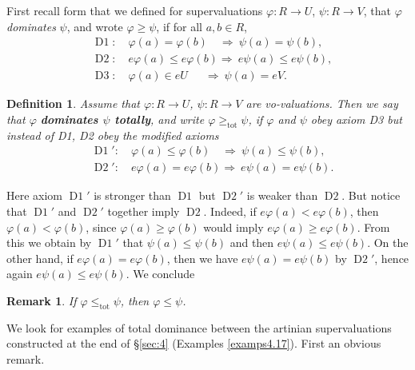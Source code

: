 \documentclass [12pt,a4paper,reqno]{amsart}
\newtheorem{remark}[thm]{Remark}
\newtheorem{defn}[thm]{Definition}
\begin{document}
First recall form \cite[\S5]{IKR1} that we defined for
supervaluations $ {\varphi}: R \to U$, $\psi: R \to V$, that ${\varphi}$
\emph{dominates} $\psi$, and wrote ${\varphi} \geq \psi$, if for all
$a,b \in R$,
\begin{align*}
& {\operatorname{D{1}}}: \quad   {\varphi}(a) = {\varphi}(b) \quad \Rightarrow  \  \psi(a) = \psi(b), \\
& {\operatorname{D{2}}}: \quad   e {\varphi}(a) \leq  e {\varphi}(b) \Rightarrow  \  e\psi(a) \leq e\psi(b), \\
& {\operatorname{D{3}}}: \quad   {\varphi}(a) \in eU  \ \; \quad \Rightarrow  \  \psi(a)
= eV.
\end{align*}
\begin{defn}\label{defn5.4} Assume that $ {\varphi}: R \to U$, $\psi: R \to
V$ are {vo}-valuations. Then we say that ${\varphi}$ \textbf{dominates
$\psi$ totally}, and write ${\varphi} {\geq_{\operatorname{tot}}} \psi$, if ${\varphi}$ and
$\psi$ obey axiom D3 but instead of D1, D2 obey the modified
axioms
\begin{align*}
& {\operatorname{D{1}}}': \quad   {\varphi}(a) \leq {\varphi}(b) \quad \Rightarrow  \  \psi(a) \leq \psi(b), \\
& {\operatorname{D{2}}}': \quad   e {\varphi}(a) =  e {\varphi}(b) \Rightarrow  \  e\psi(a) =
e\psi(b).
\end{align*}
\end{defn}
Here axiom ${\operatorname{D{1}}}'$ is stronger than ${\operatorname{D{1}}}$ but ${\operatorname{D{2}}}'$ is weaker than
${\operatorname{D{2}}}$. But notice that  ${\operatorname{D{1}}}'$ and ${\operatorname{D{2}}}'$ together imply ${\operatorname{D{2}}}$.
Indeed, if $ e{\varphi}(a) < e{\varphi}(b)$, then $ {\varphi}(a) < {\varphi}(b)$,
since $ {\varphi}(a) \geq {\varphi}(b)$ would imply $ e{\varphi}(a) \geq
e{\varphi}(b)$. From this we obtain by ${\operatorname{D{1}}}'$ that $\psi(a)  \leq
\psi(b)$ and then $e\psi(a) \leq e\psi(b)$. On the other hand, if
$e{\varphi}(a) = e {\varphi}(b)$, then we have  $e\psi(a) = e\psi(b)$ by
${\operatorname{D{2}}}'$, hence again $e\psi(a) \leq e\psi(b)$. We conclude

\begin{remark}\label{rmk5.5}
If ${\varphi} {\leq_{\operatorname{tot}}} \psi$, then ${\varphi} \leq \psi$.
\end{remark}

We look for examples of total dominance between the artinian
supervaluations constructed at the end of \S\ref{sec:4} (Examples
\ref{examps4.17}). First an obvious remark.
\end{document}
